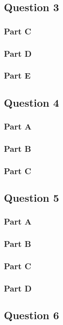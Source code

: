 

\newpage
\subsection{Question 3}
\subsubsection{Part C}
\subsubsection{Part D}
\subsubsection{Part E}

\newpage
\subsection{Question 4}
\subsubsection{Part A}
\subsubsection{Part B}
\subsubsection{Part C}

\newpage
\subsection{Question 5}
\subsubsection{Part A}
\subsubsection{Part B}
\subsubsection{Part C}
\subsubsection{Part D}

\newpage
\subsection{Question 6}

%
